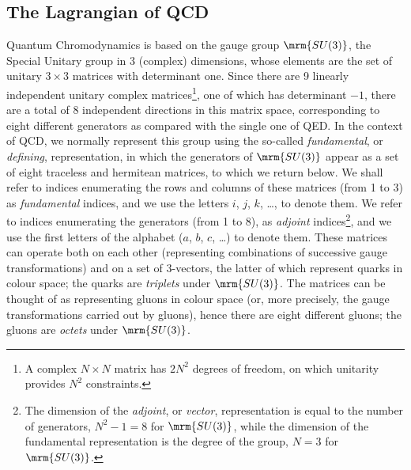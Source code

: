 \subsection{The Lagrangian of QCD \label{sec:L}}
%
Quantum Chromodynamics is based on the gauge group
$\mrm{SU(3)}$, the 
Special Unitary group in 3 (complex) dimensions, whose elements 
are the set of unitary $3\times 3$ matrices with determinant one. 
%
%
Since there are 9 linearly independent unitary complex
matrices\footnote{A complex $N\times N$ matrix has $2N^2$ degrees of
  freedom, on which unitarity provides $N^2$ constraints.}, one of
which has determinant $-1$, there are a total of 8
independent directions in this matrix space, corresponding to eight
different generators as compared
with the single one of QED. In the context of QCD, we normally
represent this group using the 
so-called \emph{fundamental}, or \emph{defining}, representation, in
which the generators of $\mrm{SU(3)}$ appear as a set of eight traceless and
hermitean matrices, to which we return below.  
We shall refer to indices enumerating
the rows and columns of these matrices  (from 1 to 3) as
\emph{fundamental} indices, and we use the letters $i$,
$j$, $k$, \ldots, to denote them.
%
%
We refer to indices enumerating the generators (from 1 to 8),
as \emph{adjoint} 
indices\footnote{The dimension of the \emph{adjoint}, or
  \emph{vector}, representation is equal to the number of generators,
  $N^2-1=8$ for $\mrm{SU(3)}$, while the  
%
%
dimension of the fundamental representation is
  the degree of the group, $N=3$ for $\mrm{SU(3)}$.}, and we use the first
letters of the alphabet ($a$, $b$, $c$, \ldots) to denote them. 
These matrices can operate both on each other (representing
combinations of successive gauge transformations) and on a set of
$3$-vectors, the latter of 
which represent quarks in colour 
space; the quarks are \emph{triplets} under $\mrm{SU(3)}$. The matrices can be
thought of as representing gluons in colour 
space (or, more precisely, the gauge transformations carried out by
gluons), hence there are
eight different gluons; the gluons are \emph{octets} under $\mrm{SU(3)}$. 

